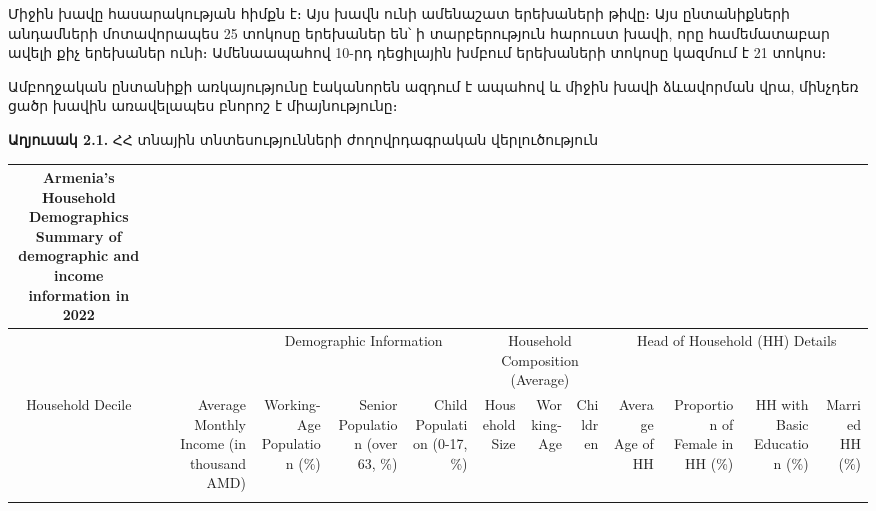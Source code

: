 \documentclass[
]{article}
\begin{document}
Միջին խավը հասարակության հիմքն է։ Այս խավն ունի ամենաշատ երեխաների թիվը։
Այս ընտանիքների անդամների մոտավորապես 25 տոկոսը երեխաներ են՝ ի
տարբերություն հարուստ խավի, որը համեմատաբար ավելի քիչ երեխաներ ունի։
Ամենաապահով 10-րդ դեցիլային խմբում երեխաների տոկոսը կազմում է 21 տոկոս։

Ամբողջական ընտանիքի առկայությունը էականորեն ազդում է ապահով և միջին խավի
ձևավորման վրա, մինչդեռ ցածր խավին առավելապես բնորոշ է միայնությունը։

\textbf{Աղյուսակ 2.1.} ՀՀ տնային տնտեսությունների ժողովրդագրական
վերլուծություն

\setlength{\LTpost}{0mm}
\begin{longtable}{crrrrrrrrrrr}
\caption*{
{\large Armenia's Household Demographics} \\ 
{\small Summary of demographic and income information in 2022}
} \\ 
\toprule
 &  & \multicolumn{3}{c}{Demographic Information} & \multicolumn{3}{c}{Household Composition (Average)} & \multicolumn{4}{c}{Head of Household (HH) Details} \\ 
\cmidrule(lr){3-5} \cmidrule(lr){6-8} \cmidrule(lr){9-12}
Household Decile & Average Monthly Income (in thousand AMD) & Working-Age Population (\%) & Senior Population (over 63, \%) & Child Population (0-17, \%) & Household Size & Working-Age & Children & Average Age of HH & Proportion of Female in HH (\%) & HH with Basic Education (\%) & Married HH (\%) \\ 
\midrule\addlinespace[2.5pt]
1 & \cellcolor[HTML]{F95D6A}{\textcolor[HTML]{FFFFFF}{$65.9$}} & \cellcolor[HTML]{FFC9C3}{\textcolor[HTML]{000000}{$52.9$%
2 & \cellcolor[HTML]{FD7379}{\textcolor[HTML]{FFFFFF}{$105.0$}} & \cellcolor[HTML]{F95D6A}{\textcolor[HTML]{FFFFFF}{$46.9$%
}}}}
\end{longtable}
\end{document}
